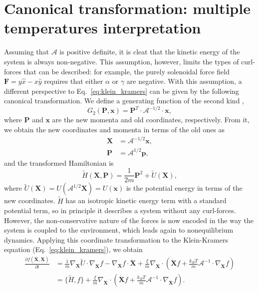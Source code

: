 \section{Canonical transformation: multiple temperatures interpretation}\label{sec:Transformation}
Assuming that $\mathcal{A}$ is positive definite, it is cleat that the kinetic energy of the system is always non-negative. This assumption, however, limits the types of curl-forces that can be described: for example, the purely solenoidal force field $\mathbf{F}=y\hat{x}-x\hat{y}$ requires that either $\alpha$ or $\gamma$ are negative.
With this assumption, a different perspective to Eq.~\ref{eq:klein_kramers} can be given by the following canonical transformation. We  define a generating function of the second kind \cite{LANDAU1976131},
\begin{equation}
    G_2(\mathbf P, \mathbf x) = \mathbf P^T \cdot \mathcal A^{-{1}/{2}}\cdot\mathbf x,
\end{equation}
where $\mathbf P$ and $\mathbf x$ are the new momenta and old coordinates, respectively. From it, we obtain the new coordinates and momenta in terms of the old ones as
\begin{equation}\label{eq:canonical_transformation}
\begin{split}
    \mathbf X &= \mathcal A^{-1/2}\mathbf x,\\
    \mathbf P &= \mathcal A^{1/2} \mathbf p,
\end{split}
\end{equation}
and the transformed Hamiltonian is
\begin{equation}
    \tilde{H}(\mathbf X, \mathbf P) = \frac{1}{2m} \mathbf P^2 + \tilde{U}\left(\mathbf X\right),
\end{equation}
where $\tilde{U}(\mathbf X) = U( \mathcal{A}^{1/2} \mathbf X) = U(\mathbf{x})$ is the potential energy in terms of the new coordinates. $\tilde{H}$ has an isotropic kinetic energy term with a standard potential term, so in principle it describes a system without any curl-forces. However, the non-conservative nature of the forces is now encoded in the way the system is coupled to the environment, which leads again to nonequilibrium dynamics. 
Applying this coordinate transformation to the Klein-Kramers equation (Eq.~\ref{eq:klein_kramers}), we obtain
\begin{align}\label{eq:CK_transformed}
    \frac{\partial f(\mathbf{X}, \dot{\mathbf{X}})}{\partial t} &= \frac{1}{m}\nabla_{\mathbf{X}} \tilde{U} \cdot \nabla_{\dot{\mathbf{X}}}f-\nabla_{\mathbf{X}} f \cdot \dot{\mathbf{X}} + \frac{\xi}{m} \nabla_{\dot {\mathbf X}} \cdot(\dot {\mathbf X} f + \frac{k_B T}{m} \mathcal{A}^{-1}\cdot\nabla_{\dot{\mathbf{X}}}f) \\
    &=\{\tilde{H}, f\} + \frac{\xi}{m} \nabla_{\dot {\mathbf X}} \cdot(\dot {\mathbf X} f + \frac{k_B T}{m} \mathcal{A}^{-1}\cdot\nabla_{\dot{\mathbf{X}}}f). \nonumber
 \end{align}
